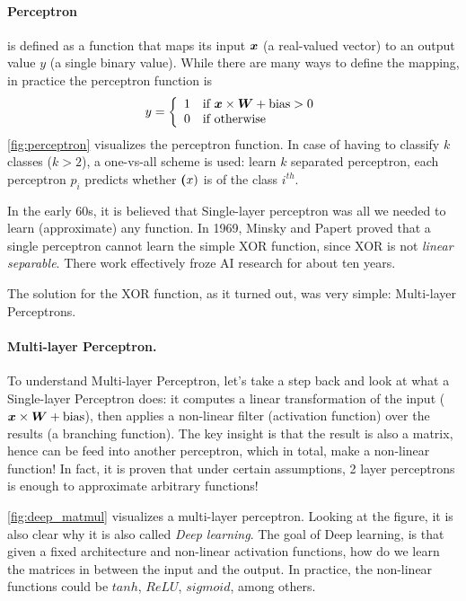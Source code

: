 \paragraph{Perceptron} is defined as a function that maps its input $\boldsymbol{x}$
(a real-valued vector) to an output value $y$ (a single binary value). While
there are many ways to define the mapping, in practice the perceptron function is
\begin{align*}
  y =  \left\{ \begin{array}{ll}  1  & \mbox{if } \boldsymbol{x} \times \boldsymbol{W} + \text{bias} > 0 \\  0  & \mbox{if } \text{otherwise} \end{array} \right.
\end{align*}
\cref{fig:perceptron} visualizes the perceptron function. In case of having to
classify $k$ classes ($k>2$), a one-vs-all scheme is used: learn $k$ separated
perceptron, each perceptron $p_i$ predicts whether $\boldsymbol{(}x)$ is of the class
$i^{th}$.

In the early 60s, it is believed that Single-layer perceptron was all we needed to learn
(approximate) any function. In 1969, Minsky and Papert \cite{perceptrons} proved
that a single perceptron cannot learn the simple XOR function, since XOR is not
\emph{linear separable}. There work effectively froze AI research for about ten years.

The solution for the XOR function, as it turned out, was very simple:
Multi-layer Perceptrons.

\paragraph{Multi-layer Perceptron.} To understand Multi-layer Perceptron, let's
take a step back and look at what a Single-layer Perceptron does: it computes a linear
transformation of the input ($\boldsymbol{x} \times \boldsymbol{W} + \text{bias}$), then
applies a non-linear filter (activation function) over the results (a branching function). The key
insight is that the result is also a matrix, hence can be feed into another
perceptron, which in total, make a non-linear function! In fact, it is proven \cite{universal}
that under certain assumptions, 2 layer perceptrons is enough to approximate arbitrary
functions!

\cref{fig:deep_matmul} visualizes a multi-layer perceptron. Looking at the
figure, it is also clear why it is also called \emph{Deep learning}. The goal of
Deep learning, is that given a fixed architecture and non-linear activation
functions, how do we learn the matrices in between the input and the output. In practice, the
non-linear functions could be $tanh$, $ReLU$, $sigmoid$, among others.



